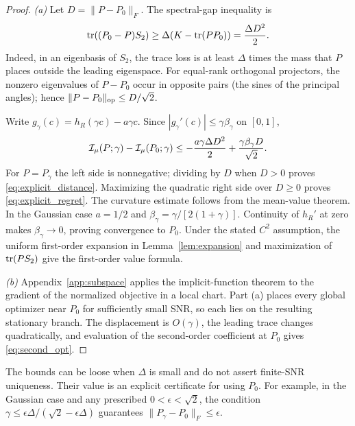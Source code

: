 \begin{proof}
\emph{(a)} Let $D=\|P-P_0\|_F$. The spectral-gap inequality is
\begin{equation}
\operatorname{tr}((P_0-P)S_2)\ge\Delta(K-\operatorname{tr}(PP_0))=\frac{\Delta D^2}{2}.
\label{eq:gap_distance}
\end{equation}
Indeed, in an eigenbasis of $S_2$, the trace loss is at least $\Delta$ times the mass that $P$ places outside the leading eigenspace. For equal-rank orthogonal projectors, the nonzero eigenvalues of $P-P_0$ occur in opposite pairs (the sines of the principal angles); hence $\|P-P_0\|_{\rm op}\le D/\sqrt2$.

Write $g_\gamma(c)=h_R(\gamma c)-a\gamma c$. Since $|g_\gamma'(c)|\le\gamma\beta_\gamma$ on $[0,1]$,
\begin{equation}
\mathcal I_\mu(P;\gamma)-\mathcal I_\mu(P_0;\gamma)
\le-\frac{a\gamma\Delta D^2}{2}
+\frac{\gamma\beta_\gamma D}{\sqrt2}.
\label{eq:quadratic_tradeoff}
\end{equation}
For $P=P_\gamma$ the left side is nonnegative; dividing by $D$ when $D>0$ proves \eqref{eq:explicit_distance}. Maximizing the quadratic right side over $D\ge0$ proves \eqref{eq:explicit_regret}. The curvature estimate follows from the mean-value theorem. In the Gaussian case $a=1/2$ and $\beta_\gamma=\gamma/[2(1+\gamma)]$.
Continuity of $h_R'$ at zero makes $\beta_\gamma\to0$, proving convergence to $P_0$. Under the stated $C^2$ assumption, the uniform first-order expansion in Lemma~\ref{lem:expansion} and maximization of $\operatorname{tr}(PS_2)$ give the first-order value formula.

\emph{(b)} Appendix~\ref{app:subspace} applies the implicit-function theorem to the gradient of the normalized objective in a local chart. Part (a) places every global optimizer near $P_0$ for sufficiently small SNR, so each lies on the resulting stationary branch. The displacement is $O(\gamma)$, the leading trace changes quadratically, and evaluation of the second-order coefficient at $P_0$ gives \eqref{eq:second_opt}.
\end{proof}

The bounds can be loose when $\Delta$ is small and do not assert finite-SNR uniqueness. Their value is an explicit certificate for using $P_0$. For example, in the Gaussian case and any prescribed $0<\epsilon<\sqrt2$, the condition
$\gamma\le\epsilon\Delta/(\sqrt2-\epsilon\Delta)$ guarantees $\|P_\gamma-P_0\|_F\le\epsilon$.

